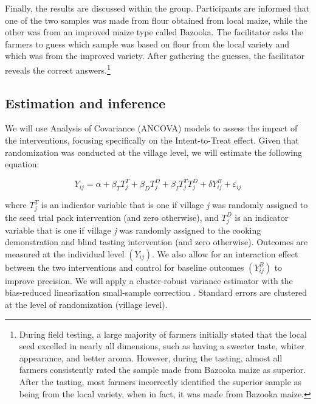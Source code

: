 \documentclass[english]{article}\usepackage[]{graphicx}\usepackage[]{xcolor}
\begin{document}
Finally, the results are discussed within the group. Participants
are informed that one of the two samples was made from flour obtained
from local maize, while the other was from an improved maize type
called Bazooka. The facilitator asks the farmers to guess which sample
was based on flour from the local variety and which was from the improved
variety. After gathering the guesses, the facilitator reveals the
correct answers.\footnote{During field testing, a large majority of farmers initially stated
that the local seed excelled in nearly all dimensions, such as having
a sweeter taste, whiter appearance, and better aroma. However, during
the tasting, almost all farmers consistently rated the sample made
from Bazooka maize as superior. After the tasting, most farmers incorrectly
identified the superior sample as being from the local variety, when
in fact, it was made from Bazooka maize.}

\subsection{Estimation and inference\label{subsec:Estimation-and-inference}}

We will use Analysis of Covariance (ANCOVA) models to assess the impact
of the interventions, focusing specifically on the Intent-to-Treat
effect. Given that randomization was conducted at the village level,
we will estimate the following equation:

\begin{equation}
Y_{ij}=\alpha+\beta_{T}T_{j}^{T}+\beta_{D}T_{j}^{D}+\beta_{I}T_{j}^{T}T_{j}^{D}+\delta Y_{ij}^{B}+\varepsilon_{ij}\label{eq:one}
\end{equation}

where $T_{j}^{T}$ is an indicator variable that is one if village
\emph{j} was randomly assigned to the seed trial pack intervention
(and zero otherwise), and $T_{j}^{D}$ is an indicator variable that
is one if village \emph{j} was randomly assigned to the cooking demonstration
and blind tasting intervention (and zero otherwise). Outcomes are
measured at the individual level $\left(Y_{ij}\right)$. We also allow
for an interaction effect between the two interventions and control
for baseline outcomes $\left(Y_{ij}^{B}\right)$ to improve precision.
We will apply a cluster-robust variance estimator with the \textquotedbl bias-reduced
linearization\textquotedbl{} small-sample correction \citep{imbens2016robust}.
Standard errors are clustered at the level of randomization (village
level). 
\end{document}
